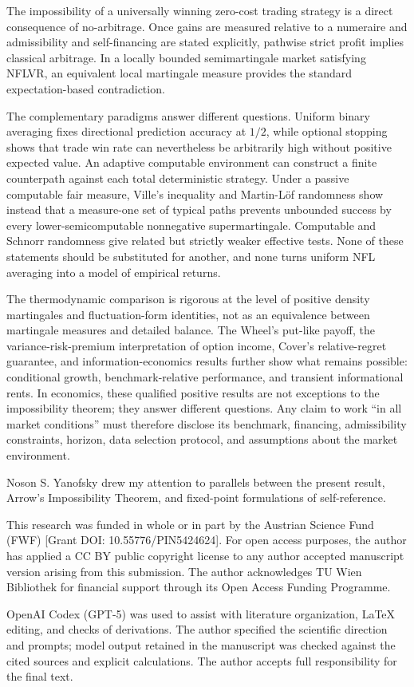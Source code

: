 \documentclass[aps,pra,reprint,superscriptaddress,amsmath,amssymb,floatfix]{revtex4-2}
\theoremstyle{plain}
\theoremstyle{definition}
\theoremstyle{remark}
\begin{document}
The impossibility of a universally winning zero-cost trading strategy is a
direct consequence of no-arbitrage. Once gains are measured relative to a
numeraire and admissibility and self-financing are stated explicitly,
pathwise strict profit implies classical arbitrage. In a locally bounded
semimartingale market satisfying NFLVR, an equivalent local martingale measure
provides the standard expectation-based contradiction.

The complementary paradigms answer different questions. Uniform binary
averaging fixes directional prediction accuracy at \(1/2\), while optional
stopping shows that trade win rate can nevertheless be arbitrarily high
without positive expected value. An adaptive computable environment can
construct a finite counterpath against each total deterministic strategy.
Under a passive computable fair measure, Ville's inequality and
Martin-L\"of randomness show instead that a measure-one set of typical paths
prevents unbounded success by every lower-semicomputable nonnegative
supermartingale. Computable and Schnorr randomness give related but strictly
weaker effective tests. None of these statements should be substituted for
another, and none turns uniform NFL averaging into a model of empirical
returns.

The thermodynamic comparison is rigorous at the level of positive density
martingales and fluctuation-form identities, not as an equivalence between
martingale measures and detailed balance. The Wheel's put-like payoff,
the variance-risk-premium interpretation of option income, Cover's
relative-regret guarantee, and information-economics results further show what
remains possible: conditional growth, benchmark-relative performance, and
transient informational rents. In economics, these qualified positive results
are not exceptions to the impossibility theorem; they answer different
questions. Any claim to work ``in all market conditions'' must therefore
disclose its benchmark, financing, admissibility constraints, horizon, data
selection protocol, and assumptions about the market environment.

\begin{acknowledgments}
Noson S. Yanofsky drew my attention to parallels between the present result,
Arrow's Impossibility Theorem, and fixed-point formulations of
self-reference.

This research was funded in whole or in part by the Austrian Science Fund
(FWF) [Grant DOI: 10.55776/PIN5424624]. For open access purposes, the author
has applied a CC BY public copyright license to any author accepted manuscript
version arising from this submission. The author acknowledges TU Wien
Bibliothek for financial support through its Open Access Funding Programme.

OpenAI Codex (GPT-5) was used to assist with literature organization, LaTeX
editing, and checks of derivations. The author specified the scientific
direction and prompts; model output retained in the manuscript was checked
against the cited sources and explicit calculations. The author accepts full
responsibility for the final text.
\end{acknowledgments}
\end{document}
